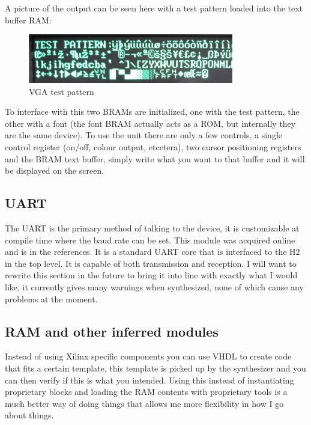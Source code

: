 \documentclass	[a4paper, 10pt]	{article}
\begin{document}
    A picture of the output can be seen here with a test pattern loaded into the text buffer RAM:

      \begin{figure}[ht]
        \centering
        \includegraphics[width=0.8\textwidth]{pic/vga.png}
        \caption{VGA test pattern}
        \label{fig:VGA test pattern}
      \end{figure}
      \FloatBarrier

    To interface with this two BRAMs are initialized, one with the test pattern, the other with
    a font (the font BRAM actually acts as a ROM, but internally they are the same device). To
    use the unit there are only a few controls, a single control register (on/off, colour output,
    etcetera), two cursor positioning registers and the BRAM text buffer, simply write what you
    want to that buffer and it will be displayed on the screen.


    \subsection{UART}

      The UART is the primary method of talking to the device, it is customizable at
      compile time where the baud rate can be set. This module was acquired online
      and is in the references\cite{uartcore}. It is a standard UART core that is
      interfaced to the H2 in the top level. It is capable of both transmission and
      reception. I will want to rewrite this section in the future to bring it into
      line with exactly what I would like, it currently gives many warnings when
      synthesized, none of which cause any problems at the moment.

    \subsection{RAM and other inferred modules}

      Instead of using Xilinx specific components you can use VHDL to create code that
      fits a certain template, this template is picked up by the synthesizer and you  
      can then verify if this is what you intended. Using this instead of instantiating
      proprietary blocks and loading the RAM contents with proprietary tools is a much better
      way of doing things that allows me more flexibility in how I go about things.
\end{document}
